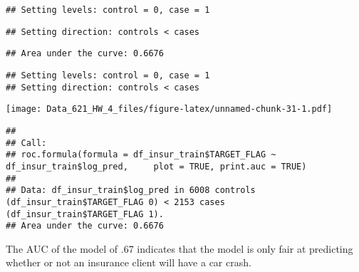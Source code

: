 \documentclass[
]{article}
\newenvironment{Shaded}{\begin{snugshade}}{\end{snugshade}}
\newcommand{\AttributeTok}[1]{\textcolor[rgb]{0.77,0.63,0.00}{#1}}
\newcommand{\ConstantTok}[1]{\textcolor[rgb]{0.00,0.00,0.00}{#1}}
\newcommand{\FunctionTok}[1]{\textcolor[rgb]{0.00,0.00,0.00}{#1}}
\newcommand{\NormalTok}[1]{#1}
\newcommand{\SpecialCharTok}[1]{\textcolor[rgb]{0.00,0.00,0.00}{#1}}
\begin{document}
\begin{Shaded}
\end{Shaded}

\begin{verbatim}
## Setting levels: control = 0, case = 1
\end{verbatim}

\begin{verbatim}
## Setting direction: controls < cases
\end{verbatim}

\begin{verbatim}
## Area under the curve: 0.6676
\end{verbatim}

\begin{Shaded}
\end{Shaded}

\begin{verbatim}
## Setting levels: control = 0, case = 1
## Setting direction: controls < cases
\end{verbatim}

\texttt{[image: Data\_621\_HW\_4\_files/figure-latex/unnamed-chunk-31-1.pdf]}

\begin{verbatim}
## 
## Call:
## roc.formula(formula = df_insur_train$TARGET_FLAG ~ df_insur_train$log_pred,     plot = TRUE, print.auc = TRUE)
## 
## Data: df_insur_train$log_pred in 6008 controls (df_insur_train$TARGET_FLAG 0) < 2153 cases (df_insur_train$TARGET_FLAG 1).
## Area under the curve: 0.6676
\end{verbatim}

The AUC of the model of .67 indicates that the model is only fair at
predicting whether or not an insurance client will have a car crash.
\end{document}
